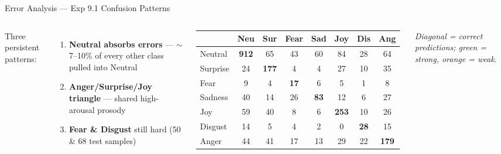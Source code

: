 \documentclass[aspectratio=169,10pt]{beamer}
\begin{document}
\begin{frame}{Error Analysis --- Exp 9.1 Confusion Patterns}
  \begin{columns}[T]
    \small
    \vspace{0.5em}
    Three persistent patterns:
    \vspace{0.4em}
    \begin{enumerate}
      \item \textbf{Neutral absorbs errors} --- $\sim$7--10\% of every other class pulled into Neutral
      \item \textbf{Anger/Surprise/Joy triangle} --- shared high-arousal prosody
      \item \textbf{Fear \& Disgust} still hard (50 \& 68 test samples)
    \end{enumerate}

    \centering
    \vspace{0.3em}
    \scriptsize
    \setlength{\tabcolsep}{3pt}
    \renewcommand{\arraystretch}{1.15}
    \begin{tabular}{l ccccccc}
      \toprule
               & \textbf{Neu} & \textbf{Sur} & \textbf{Fear} & \textbf{Sad} & \textbf{Joy} & \textbf{Dis} & \textbf{Ang} \\
      \midrule
      Neutral  & \cellcolor{tgreen!45}\textbf{912} & 65 & 43 & 60 & 84 & 28 & 64 \\
      Surprise & 24 & \cellcolor{tgreen!45}\textbf{177} & 4 & 4 & 27 & 10 & 35 \\
      Fear     & 9 & 4 & \cellcolor{torange!45}\textbf{17} & 6 & 5 & 1 & 8 \\
      Sadness  & 40 & 14 & 26 & \cellcolor{torange!45}\textbf{83} & 12 & 6 & 27 \\
      Joy      & 59 & 40 & 8 & 6 & \cellcolor{tgreen!45}\textbf{253} & 10 & 26 \\
      Disgust  & 14 & 5 & 4 & 2 & 0 & \cellcolor{torange!45}\textbf{28} & 15 \\
      Anger    & 44 & 41 & 17 & 13 & 29 & 22 & \cellcolor{tgreen!45}\textbf{179} \\
      \bottomrule
    \end{tabular}
    \vspace{0.4em}

    \tiny \emph{Diagonal = correct predictions; green = strong, orange = weak.}
  \end{columns}
\end{frame}
\end{document}
